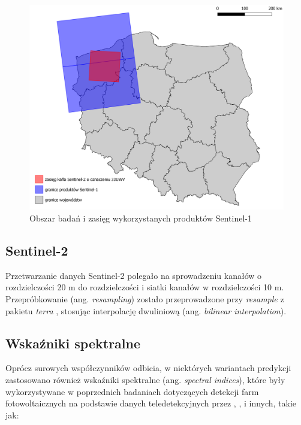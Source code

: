 \documentclass{amuthesis}
\begin{document}
\begin{figure}[t]

{\centering \includegraphics[width=1\textwidth,height=\textheight]{figures/sen1_extents.png}

}

\caption{\label{fig-rycina-s1-extents}Obszar badań i zasięg
wykorzystanych produktów Sentinel-1}

\end{figure}

\hypertarget{sec-processing-s2}{%
\subsection{Sentinel-2}\label{sec-processing-s2}}

Przetwarzanie danych Sentinel-2 polegało na sprowadzeniu kanałów o
rozdzielczości 20 m do rozdzielczości i siatki kanałów w rozdzielczości
10 m. Przepróbkowanie (ang. \emph{resampling}) zostało przeprowadzone
przy \emph{resample} z pakietu \emph{terra} \autocite{R-terra}, stosując
interpolację dwuliniową (ang. \emph{bilinear interpolation}).

\hypertarget{wskaux17aniki-spektralne}{%
\subsection{Wskaźniki spektralne}\label{wskaux17aniki-spektralne}}

Oprócz surowych współczynników odbicia, w niektórych wariantach
predykcji zastosowano również wskaźniki spektralne (ang. \emph{spectral
indices}), które były wykorzystywane w poprzednich badaniach dotyczących
detekcji farm fotowoltaicznych na podstawie danych teledetekcyjnych
przez \textcite{zhang_2021_texture}, \textcite{plakman_2022_pv},
\textcite{wang_2022_pv} i innych, takie jak:
\end{document}
